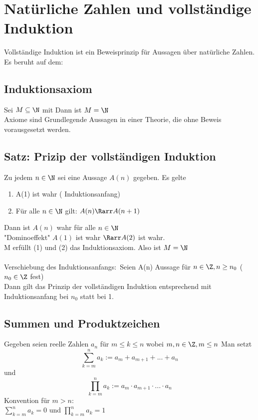 \chapter{Natürliche Zahlen und vollständige Induktion}
Vollständige Induktion ist ein Beweisprinzip für Aussagen über natürliche Zahlen.\\
Es beruht auf dem:
\section{Induktionsaxiom}
Sei $M \subseteq \N$ mit
Dann ist $M = \N$\\
\bem Axiome sind Grundlegende Aussagen in einer Theorie, die ohne Beweis vorausgesetzt werden.
\section{Satz: Prizip der vollständigen Induktion}
Zu jedem $n \in \N$ sei eine Aussage $A(n)$ gegeben. Es gelte
\begin{enumerate}
\item {A(1) ist wahr ( {Induktionsanfang})}
\item Für alle $n \in \N$ gilt: $A(n) \Rarr A(n+1)$
\end{enumerate}
Dann ist $A(n)$ wahr für alle $n \in \N$\\
"Dominoeffekt" $A(1)$ ist wahr $\Rarr A(2)$ ist wahr.\\
M erfüllt (1) und (2) das Induktionsaxiom. Also ist $M = \N$\\
\\
%
Verschiebung des Induktionsanfangs:\
Seien A(n) Aussage für $n \in \Z, n \geq n_0$ ($n_0 \in \Z$ fest)\\
Dann gilt das Prinzip der vollständigen Induktion entsprechend mit Induktionsanfang bei $n_0$ statt bei 1.
\section*{Summen und Produktzeichen}
Gegeben seien reelle Zahlen $a_n$ für $m \leq k \leq n$ wobei $m,n \in \Z, m \leq n$ Man setzt 
$$\sum_{k=m}^{n} a_k := a_m + a_{m+1} + ... + a_{n} $$
und 
$$ \prod_{k = m}^{n} a_k := a_m \cdot a_{m+1} \cdot ... \cdot a_n $$
Konvention für $m > n$:\\
$\sum_{k=m}^{n} a_k = 0$
und
$\prod_{k=m}^{n} a_k = 1$
